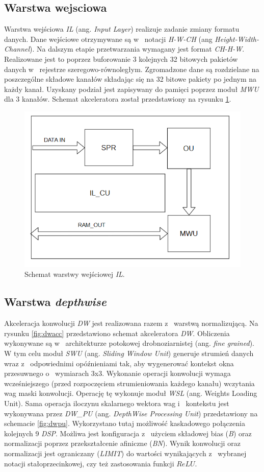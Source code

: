 \subsection{Warstwa wejsciowa}
Warstwa wejściowa \emph{IL} (ang. \emph{Input Layer}) realizuje zadanie zmiany formatu danych.
Dane wejściowe otrzymywane są w~ notacji \emph{H-W-CH} (ang \emph{Height-Width-Channel}).
Na dalszym etapie przetwarzania wymagany jest format \emph{CH-H-W}.
Realizowane jest to poprzez buforowanie 3 kolejnych 32 bitowych pakietów danych w~ rejestrze szeregowo-równoległym.
Zgromadzone dane są rozdzielane na poszczególne składowe kanałów składając się na 32 bitowe pakiety po jednym na każdy kanał.
Uzyskany podział jest zapisywany do pamięci poprzez moduł \emph{MWU} dla 3 kanałów.
Schemat akceleratora został przedstawiony na rysunku \ref{fig:il}.
\begin{figure}
    \centering
    \includegraphics[width=0.8\linewidth]{images/ILACC.png}
    \caption{Schemat warstwy wejściowej \emph{IL}.}
    \label{fig:il}
\end{figure}

\subsection{Warstwa \emph{depthwise}}
Akceleracja konwolucji \emph{DW} jest realizowana razem z~ warstwą normalizującą.
Na rysunku \ref{fig:dwacc} przedstawiono schemat akceleratora \emph{DW}.
Obliczenia wykonywane są w~ architekturze potokowej drobnoziarnistej (ang. \emph{fine grained}). 
W tym celu moduł \emph{SWU} (ang. \emph{Sliding Window Unit}) generuje strumień danych wraz z~ odpowiednimi opóźnieniami tak, aby wygenerować kontekst okna przesuwnego o~ wymiarach 3x3.
Wykonanie operacji konwolucji wymaga wcześniejszego (przed rozpoczęciem strumieniowania każdego kanału) wczytania wag maski konwolucji.
Operację tę wykonuje moduł \emph{WSL} (ang. Weights Loading Unit).
Sama operacja iloczynu skalarnego wektora wag i~ kontekstu jest wykonywana przez \emph{DW\_PU} (ang. \emph{DepthWise Processing Unit}) przedstawiony na schemacie \ref{fig:dwpu}.
Wykorzystano tutaj możliwość kaskadowego połączenia kolejnych 9 \emph{DSP}. 
Możliwa jest konfiguracja z~ użyciem składowej bias (\emph{B}) oraz normalizacji poprzez przekształcenie afiniczne (\emph{BN}).
Wynik konwolucji oraz normalizacji jest ograniczany (\emph{LIMIT}) do wartości wynikających z~ wybranej notacji stałoprzecinkowej, czy też zastosowania funkcji $ReLU$.

